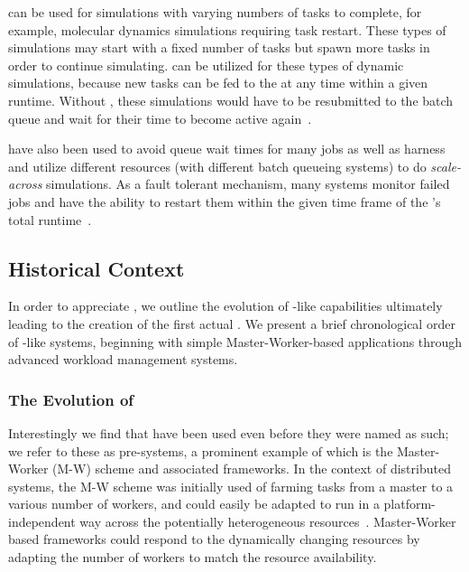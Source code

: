\documentclass{sig-alternate}
\begin{document}
\pilotjobs can be used for  simulations
 with varying numbers of tasks to complete, for example,
molecular dynamics simulations requiring task restart. These types of 
 simulations may start with a fixed number of tasks but spawn 
 more tasks in order to continue simulating. \pilotjobs can be
utilized for these types of dynamic simulations, because 
new tasks can be fed to the \pilot at any time within a given 
runtime. Without \pilotjobs, these simulations would have to 
be resubmitted to the batch queue and wait for their time
to become active again~\cite{luckow2009adaptive}.

\pilotjobs have also been used to avoid queue wait times for many jobs
as well as harness and utilize different resources (with different
batch queueing systems) to do \textit{scale-across} simulations.
As a fault tolerant mechanism, many \pilotjob systems monitor
failed jobs and have the ability to restart them within the given 
time frame of the \pilotjob's total runtime~\cite{1742-6596-219-6-062049,condor-g,nilsson2011atlas}. 

\subsection{Historical Context}

In order to appreciate \pilotjobs, we outline the evolution of
\pilot-like capabilities ultimately leading to the creation of the
first actual \pilotjob. We present a brief chronological order of
\pilotjob-like systems, beginning with simple Master-Worker-based
applications through advanced workload management systems.

\subsubsection*{The Evolution of \pilotjobs} 

Interestingly we find that \pilotjobs have been used even before they
were named as such; we refer to these as pre-\pilotjob systems, a
prominent example of which is the Master-Worker (M-W) scheme and
associated frameworks.  In the context of distributed systems, the M-W
scheme was initially used of farming tasks from a master to a various
number of workers, and could easily be adapted to run in a
platform-independent way across the potentially heterogeneous
resources~\cite{masterworker, Goux00anenabling}. Master-Worker based
frameworks could respond to the dynamically changing resources by
adapting the number of workers to match the resource availability.
\end{document}
